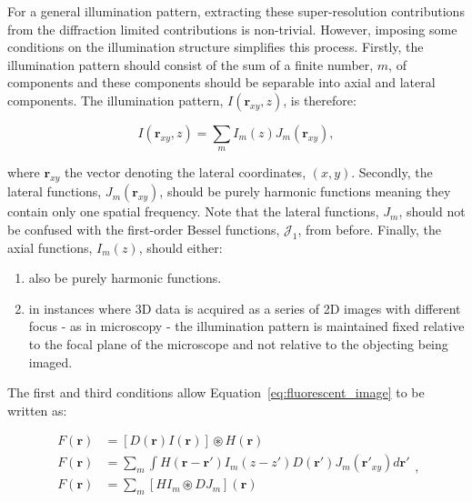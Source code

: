 For a general illumination pattern, extracting these super-resolution 
contributions from the diffraction limited contributions is non-trivial.
However, imposing some conditions on the illumination structure simplifies
this process\cite{gustafsson2008three}. Firstly, the illumination pattern 
should consist of the sum of a finite number, $m$, of components and these
components should be separable into axial and lateral components. The 
illumination pattern, $I(\textbf{r}_{xy},z)$, is therefore:

\begin{equation}\label{eq:illumination_components}
I(\textbf{r}_{xy},z) = \sum\limits_{m}{I_{m}(z)J_{m}(\textbf{r}_{xy})},
\end{equation}

where $\textbf{r}_{xy}$ the vector denoting the lateral coordinates, $(x,y)$.
Secondly, the lateral functions, $J_{m}(\textbf{r}_{xy})$, should be purely
harmonic functions meaning they contain only one spatial frequency. Note that 
the lateral functions, $J_{m}$, should not be confused with the first-order 
Bessel functions, $\mathcal{J}_{1}$, from before. Finally, the axial 
functions, $I_{m}(z)$, should either: 

\begin{enumerate}
	\item also be purely harmonic functions.
	\item in instances where 3D data is acquired as a series of 2D images with 
	different focus - as in microscopy - the illumination pattern is maintained 
	fixed relative to the focal plane of the microscope and not relative to the
	objecting being imaged.
\end{enumerate}

The first and third conditions allow Equation~\ref{eq:fluorescent_image} to be
written as:

\begin{equation}\label{eq:fluorescent_image_conditions}
\begin{split}
F(\textbf{r}) &= [D(\textbf{r})I(\textbf{r})] \circledast H(\textbf{r})\\
F(\textbf{r}) &= \sum\limits_{m}{\int H(\textbf{r}-\textbf{r}')I_{m}(z - z')D(\textbf{r}')J_{m}(\textbf{r}'_{xy})}d\textbf{r}'\\
F(\textbf{r}) &= \sum\limits_{m}{\left[HI_{m}\circledast DJ_{m}\right](\textbf{r})}\\
\end{split},
\end{equation}

